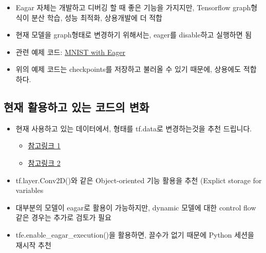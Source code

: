 \documentclass[11pt]{article}
\providecommand{\tightlist}{%
      \setlength{\itemsep}{0pt}\setlength{\parskip}{0pt}}
\begin{document}
\begin{itemize}
\tightlist
\item
  Eagar 자체는 개발하고 디버깅 할 때 좋은 기능을 가지지만, Tensorflow
  graph형식이 분산 학습, 성능 최적화, 상용개발에 더 적합
\item
  현재 모델을 graph형태로 변경하기 위해서는, eager를 disable하고
  실행하면 됨
\item
  관련 예제 코드:
  \href{https://github.com/tensorflow/tensorflow/tree/master/tensorflow/contrib/eager/python/examples/mnist}{MNIST
  with Eager}
\item
  위의 예제 코드는 checkpoints를 저장하고 불러올 수 있기 때문에,
  상용에도 적합하다.
\end{itemize}

\hypertarget{uxd604uxc7ac-uxd65cuxc6a9uxd558uxace0-uxc788uxb294-uxcf54uxb4dcuxc758-uxbcc0uxd654}{%
\subsection{현재 활용하고 있는 코드의
변화}\label{uxd604uxc7ac-uxd65cuxc6a9uxd558uxace0-uxc788uxb294-uxcf54uxb4dcuxc758-uxbcc0uxd654}}

\begin{itemize}
\tightlist
\item
  현재 사용하고 있는 데이터에서, 형태를 tf.data로 변경하는것을 추천
  드립니다.

  \begin{itemize}
  \tightlist
  \item
    \href{https://developers.googleblog.com/2017/09/introducing-tensorflow-datasets.html}{참고링크
    1}
  \item
    \href{https://www.tensorflow.org/programmers_guide/datasets}{참고링크
    2}
  \end{itemize}
\item
  tf.layer.Conv2D()와 같은 Object-oriented 기능 활용을 추천 (Explict
  storage for variables
\item
  대부분의 모델이 eagar로 활용이 가능하지만, dynamic 모델에 대한 control
  flow같은 경우는 추가로 검토가 필요
\item
  tfe.enable\_eagar\_execution()을 활용하면, 끌수가 없기 때문에 Python
  세션을 재시작 추천
\end{itemize}


    
    
    
    
\end{document}
